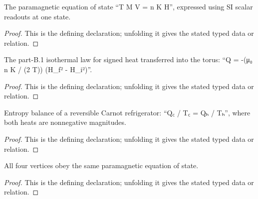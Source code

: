 \begin{definition}[SatisfiesParamagneticEquationOfState]
  \label{decl:physics:IPhO_2026_3_C_2:SatisfiesParamagneticEquationOfState}
  The paramagnetic equation of state “T M V = n K H”, expressed using SI scalar readouts at one state.
\end{definition}
\begin{proof}
  This is the defining declaration; unfolding it gives the stated typed data or relation.
\end{proof}

\begin{definition}[SatisfiesIsothermalHeatLaw]
  \label{decl:physics:IPhO_2026_3_C_2:SatisfiesIsothermalHeatLaw}
  The part-B.1 isothermal law for signed heat transferred into the torus: “Q = -(μ₀ n K / (2 T)) (H\_f² - H\_i²)”.
\end{definition}
\begin{proof}
  This is the defining declaration; unfolding it gives the stated typed data or relation.
\end{proof}

\begin{definition}[SatisfiesReversibleCarnotHeatBalance]
  \label{decl:physics:IPhO_2026_3_C_2:SatisfiesReversibleCarnotHeatBalance}
  Entropy balance of a reversible Carnot refrigerator: “Q꜀ / T꜀ = Qₕ / Tₕ”, where both heats are nonnegative magnitudes.
\end{definition}
\begin{proof}
  This is the defining declaration; unfolding it gives the stated typed data or relation.
\end{proof}

\begin{definition}[EquationOfStateAtVertices]
  \label{decl:physics:IPhO_2026_3_C_2:EquationOfStateAtVertices}
  All four vertices obey the same paramagnetic equation of state.
\end{definition}
\begin{proof}
  This is the defining declaration; unfolding it gives the stated typed data or relation.
\end{proof}

